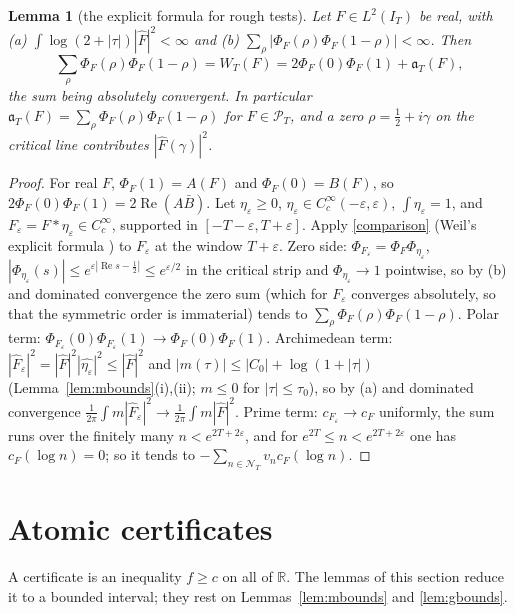\documentclass[10pt]{amsart}
\newtheorem{lemma}[theorem]{Lemma}
\theoremstyle{definition}
\theoremstyle{remark}
\newcommand{\R}{\mathbb R}
\newcommand{\Rel}{\operatorname{Re}}
\newcommand{\PT}{\mathcal P_T}
\newcommand{\IT}{I_T}
\newcommand{\Fh}{\widehat F}
\newcommand{\cF}{c_F}
\newcommand{\NT}{\mathcal N_T}
\begin{document}
\begin{lemma}[the explicit formula for rough tests]\label{lem:roughEF}
Let $F\in L^2(\IT)$ be real, with \emph{(a)} $\int\log(2+|\tau|)|\Fh|^2<\infty$ and \emph{(b)}
$\sum_\rho|\Phi_F(\rho)\Phi_F(1-\rho)|<\infty$. Then
\[
\sum_\rho\Phi_F(\rho)\Phi_F(1-\rho)=W_T(F)=2\Phi_F(0)\Phi_F(1)+\mathfrak a_T(F),
\]
the sum being absolutely convergent. In particular $\mathfrak a_T(F)=\sum_\rho\Phi_F(\rho)\Phi_F(1-\rho)$
for $F\in\PT$, and a zero $\rho=\frac12+i\gamma$ on the critical line contributes $|\Fh(\gamma)|^2$.
\end{lemma}
\begin{proof}
For real $F$, $\Phi_F(1)=A(F)$ and $\Phi_F(0)=B(F)$, so $2\Phi_F(0)\Phi_F(1)=2\Rel(A\bar B)$. Let
$\eta_\varepsilon\ge0$, $\eta_\varepsilon\in C_c^\infty(-\varepsilon,\varepsilon)$, $\int\eta_\varepsilon=1$,
and $F_\varepsilon=F*\eta_\varepsilon\in C_c^\infty$, supported in $[-T-\varepsilon,T+\varepsilon]$.
Apply \eqref{comparison} (Weil's explicit formula \cite{Weil52,Bombieri2000}) to $F_\varepsilon$ at the window $T+\varepsilon$. Zero side:
$\Phi_{F_\varepsilon}=\Phi_F\Phi_{\eta_\varepsilon}$, $|\Phi_{\eta_\varepsilon}(s)|\le e^{\varepsilon|\Rel s-\frac12|}\le e^{\varepsilon/2}$
in the critical strip and $\Phi_{\eta_\varepsilon}\to1$ pointwise, so by (b) and dominated convergence
the zero sum (which for $F_\varepsilon$ converges absolutely, so that the symmetric order is
immaterial) tends to $\sum_\rho\Phi_F(\rho)\Phi_F(1-\rho)$. Polar term:
$\Phi_{F_\varepsilon}(0)\Phi_{F_\varepsilon}(1)\to\Phi_F(0)\Phi_F(1)$. Archimedean term:
$|\Fh_\varepsilon|^2=|\Fh|^2|\widehat{\eta_\varepsilon}|^2\le|\Fh|^2$ and $|m(\tau)|\le|C_0|+\log(1+|\tau|)$
(Lemma~\ref{lem:mbounds}(i),(ii); $m\le0$ for $|\tau|\le\tau_0$), so by (a) and dominated convergence
$\frac1{2\pi}\int m|\Fh_\varepsilon|^2\to\frac1{2\pi}\int m|\Fh|^2$. Prime term: $c_{F_\varepsilon}\to\cF$
uniformly, the sum runs over the finitely many $n<e^{2T+2\varepsilon}$, and for
$e^{2T}\le n<e^{2T+2\varepsilon}$ one has $\cF(\log n)=0$; so it tends to $-\sum_{n\in\NT}v_n\cF(\log n)$.
\end{proof}


\section{Atomic certificates}\label{sec:tails}

A certificate is an inequality $f\ge c$ on all of $\R$. The lemmas of this section reduce it to a
bounded interval; they rest on Lemmas~\ref{lem:mbounds} and \ref{lem:gbounds}.
\end{document}
